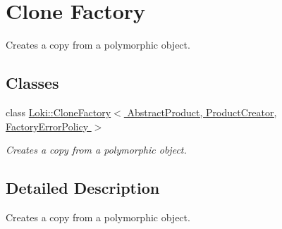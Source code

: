 \hypertarget{group__CloneFactoryGroup}{}\section{Clone Factory}
\label{group__CloneFactoryGroup}


Creates a copy from a polymorphic object.  


\subsection*{Classes}
\begin{DoxyCompactItemize}
\item 
class \hyperlink{classLoki_1_1CloneFactory}{Loki\+::\+Clone\+Factory$<$ Abstract\+Product, Product\+Creator, Factory\+Error\+Policy $>$}
\begin{DoxyCompactList}\small\item\em Creates a copy from a polymorphic object. \end{DoxyCompactList}\end{DoxyCompactItemize}


\subsection{Detailed Description}
Creates a copy from a polymorphic object. 

